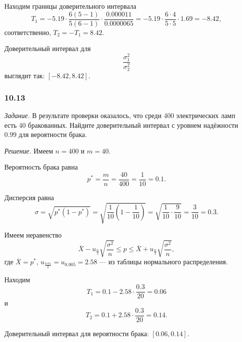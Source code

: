 Находим границы доверительного интервала
$$T_1 =
  -5.19 \cdot \frac{6 \left( 5 - 1 \right) }{5 \left( 6 - 1 \right) } \cdot
  \frac{0.000011}{0.0000065} =
  -5.19 \cdot \frac{6 \cdot 4}{5 \cdot 5} \cdot 1.69 =
  -8.42,$$
соответственно, $T_2 = -T_1 = 8.42$.

Доверительный интервал для
$$ \frac{ \sigma_1^2}{ \sigma_2^2}$$
выглядит так: $ \left[ -8.42, 8.42 \right] $.

\subsubsection*{10.13}

\textit{Задание.}
В результате проверки оказалось, что среди 400 электрических ламп есть 40 бракованных.
Найдите доверительный интервал с уровнем надёжности $0.99$ для вероятности брака.

\textit{Решение.} Имеем $n = 400$ и $m = 40$.

Вероятность брака равна
$$p^* =
  \frac{m}{n} =
  \frac{40}{400} =
  \frac{1}{10} =
  0.1.$$

Дисперсия равна
$$ \sigma =
  \sqrt{ p^* \left( 1 - p^* \right) } =
  \sqrt{ \frac{1}{10} \left( 1 - \frac{1}{10} \right) } =
  \sqrt{ \frac{1}{10} \cdot \frac{9}{10}} =
  \frac{3}{10} =
  0.3.$$

Имеем неравенство
$$ \overline{X} - u_{ \frac{ \alpha }{2}} \sqrt{ \frac{ \sigma^2}{n}} \leq
  p \leq
  \overline{X} + u_{ \frac{ \alpha }{2}} \sqrt{ \frac{ \sigma^2}{n}},$$
где $ \overline{X} = p^*, \, u_{ \frac{0.01}{2}} = u_{0.005} = 2.58$ ---
из таблицы нормального распределения.

Находим
$$T_1 =
  0.1 - 2.58 \cdot \frac{0.3}{20} =
  0.06$$
и
$$T_2 =
  0.1 + 2.58 \cdot \frac{0.3}{20} =
  0.14.$$

Доверительный интервал для вероятности брака: $ \left[ 0.06, 0.14 \right] $.
